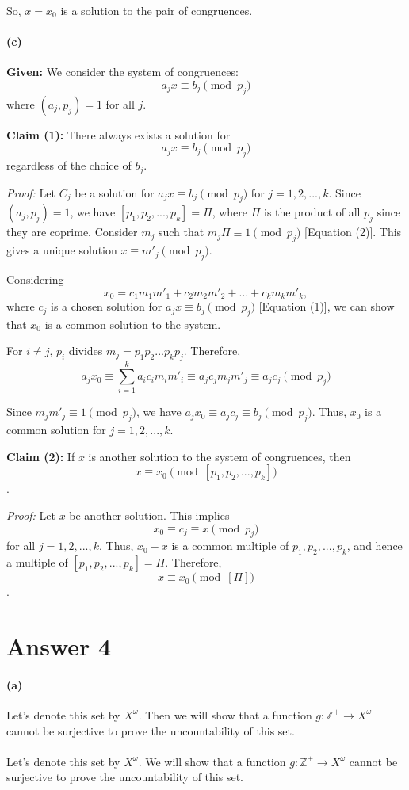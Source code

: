 \documentclass[12pt]{article}
\begin{document}
So, \(x = x_0\) is a solution to the pair of congruences.


\paragraph{(c)}

\textbf{Given:}
We consider the system of congruences:
\[
a_jx \equiv b_j \pmod{p_j}
\]
where $(a_j, p_j) = 1$ for all $j$.

\textbf{Claim (1):}
There always exists a solution for
\[
a_jx \equiv b_j \pmod{p_j}
\]
regardless of the choice of $b_j$.

\textit{Proof:}
Let $C_j$ be a solution for $a_jx \equiv b_j \pmod{p_j}$ for $j = 1,2,...,k$. Since $(a_j, p_j) = 1$, we have $[p_1, p_2, ..., p_k] = \Pi$, where $\Pi$ is the product of all $p_j$ since they are coprime. Consider $m_j$ such that $m_j\Pi \equiv 1 \pmod{p_j}$ [Equation (2)]. This gives a unique solution $x \equiv m'_j \pmod{p_j}$.

Considering
\[
x_0 = c_1m_1m'_1 + c_2m_2m'_2 + ... + c_km_km'_k,
\]
where $c_j$ is a chosen solution for $a_jx \equiv b_j \pmod{p_j}$ [Equation (1)], we can show that $x_0$ is a common solution to the system.

For $i \neq j$, $p_i$ divides $m_j = p_1p_2...p_kp_j$. Therefore,
\[
a_jx_0 \equiv \sum_{i=1}^{k} a_ic_im_im'_i \equiv a_jc_jm_jm'_j \equiv a_jc_j \pmod{p_j}
\]

Since $m_jm'_j \equiv 1 \pmod{p_j}$, we have $a_jx_0 \equiv a_jc_j \equiv b_j \pmod{p_j}$. Thus, $x_0$ is a common solution for $j = 1,2,...,k$.

\textbf{Claim (2):}
If $x$ is another solution to the system of congruences, then
\[
x \equiv x_0 \pmod{[p_1, p_2, ..., p_k]}
\].

\textit{Proof:}
Let $x$ be another solution. This implies
\[
x_0 \equiv c_j \equiv x \pmod{p_j}
\]
for all $j = 1,2,...,k$. Thus, $x_0 - x$ is a common multiple of $p_1, p_2, ..., p_k$, and hence a multiple of $[p_1, p_2, ..., p_k] = \Pi$. Therefore,
\[
x \equiv x_0 \pmod{[\Pi]}
\].

\section*{Answer 4}
\paragraph{(a)}
Let's denote this set by \(X^{\omega}\). Then we will show that a function \(g : \mathbb{Z}^+ \rightarrow X^{\omega}\) cannot be surjective
to prove the uncountability of this set.
\\ \\
Let's denote this set by \(X^\omega\). We will show that a function \(g:\mathbb{Z}^+ \rightarrow X^\omega\) cannot be surjective to prove the uncountability of this set.
\end{document}
